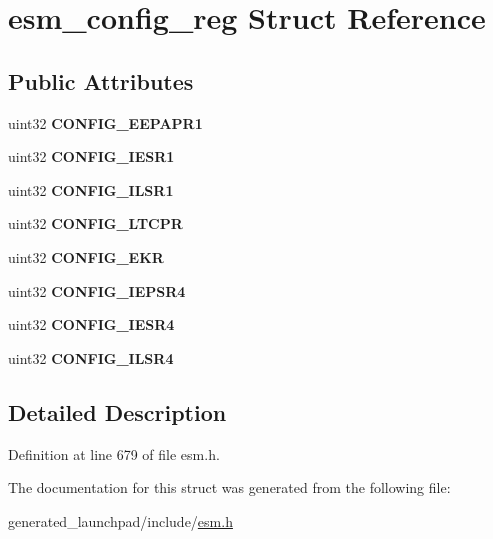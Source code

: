 \hypertarget{structesm__config__reg}{}\section{esm\+\_\+config\+\_\+reg Struct Reference}
\label{structesm__config__reg}
\subsection*{Public Attributes}
\begin{DoxyCompactItemize}
\item 
\mbox{\label{structesm__config__reg_aef3c4dc4feaf0fd7dc5a51829b08d53f}} 
uint32 {\bfseries C\+O\+N\+F\+I\+G\+\_\+\+E\+E\+P\+A\+P\+R1}
\item 
\mbox{\label{structesm__config__reg_a3ba016e2a4dadb283f05fd587da98aaa}} 
uint32 {\bfseries C\+O\+N\+F\+I\+G\+\_\+\+I\+E\+S\+R1}
\item 
\mbox{\label{structesm__config__reg_a2a6f377b457fc36b5029dfc9465724b6}} 
uint32 {\bfseries C\+O\+N\+F\+I\+G\+\_\+\+I\+L\+S\+R1}
\item 
\mbox{\label{structesm__config__reg_a1852c9ff1cc4336fe8c991d3a9f32880}} 
uint32 {\bfseries C\+O\+N\+F\+I\+G\+\_\+\+L\+T\+C\+PR}
\item 
\mbox{\label{structesm__config__reg_a35b3ffe76ad5b273cfdd2d6dc804131f}} 
uint32 {\bfseries C\+O\+N\+F\+I\+G\+\_\+\+E\+KR}
\item 
\mbox{\label{structesm__config__reg_ab9193b658820f0838dc703daa7685ac4}} 
uint32 {\bfseries C\+O\+N\+F\+I\+G\+\_\+\+I\+E\+P\+S\+R4}
\item 
\mbox{\label{structesm__config__reg_ad67cff760bd5dff6bcbef850fac6e6c2}} 
uint32 {\bfseries C\+O\+N\+F\+I\+G\+\_\+\+I\+E\+S\+R4}
\item 
\mbox{\label{structesm__config__reg_a413f21f9102624979cd25becab200b0e}} 
uint32 {\bfseries C\+O\+N\+F\+I\+G\+\_\+\+I\+L\+S\+R4}
\end{DoxyCompactItemize}


\subsection{Detailed Description}


Definition at line 679 of file esm.\+h.



The documentation for this struct was generated from the following file\+:\begin{DoxyCompactItemize}
\item 
generated\+\_\+launchpad/include/\mbox{\hyperlink{esm_8h}{esm.\+h}}\end{DoxyCompactItemize}

